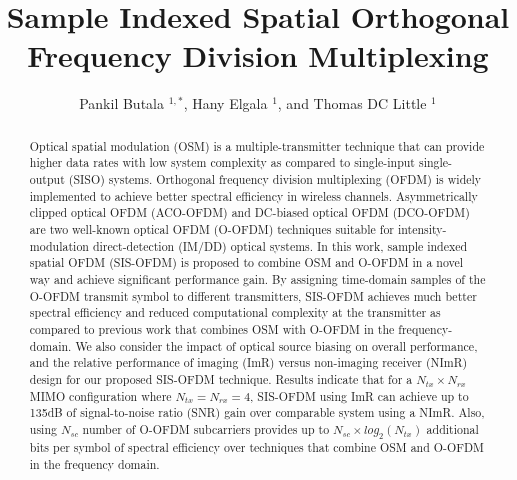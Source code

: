 \documentclass[12pt,letterpaper,onecolumn]{article} %
\begin{document}
\title{Sample Indexed Spatial Orthogonal Frequency Division Multiplexing}

\renewcommand{\baselinestretch}{0.9}
\begin{center}
\begin{CJK*}{GBK}{kai}
\author{Pankil Butala $^{1,*}$, Hany Elgala $^1$,  and Thomas DC Little $^1$\\}
\end{CJK*}
\end{center}
\address{
\emph{$^1$\emph{Department of Electrical and Computer Engineering,\\ Boston University, Boston, MA 02215, USA\\}}
$^*$\emph{Corresponding author: pbutala@bu.edu}
}
\begin{abstract} 
Optical spatial modulation (OSM) is a multiple-transmitter technique that can provide higher data rates with low system complexity as compared to single-input single-output (SISO) systems. Orthogonal frequency division multiplexing (OFDM) is widely implemented to achieve better spectral efficiency in wireless channels. Asymmetrically clipped optical OFDM (ACO-OFDM) and DC-biased optical OFDM (DCO-OFDM) are two well-known optical OFDM (O-OFDM) techniques suitable for intensity-modulation direct-detection (IM/DD) optical systems. In this work, sample indexed spatial OFDM (SIS-OFDM) is proposed to combine OSM and O-OFDM in a novel way and achieve significant performance gain. By assigning time-domain samples of the O-OFDM transmit symbol to different transmitters, SIS-OFDM achieves much better spectral efficiency and reduced computational complexity at the transmitter as compared to previous work that combines OSM with O-OFDM in the frequency-domain. We also consider the impact of optical source biasing on overall performance, and the relative performance of imaging (ImR) versus non-imaging receiver (NImR) design for our proposed SIS-OFDM technique. Results indicate that for a $N_{tx}\times N_{rx}$ MIMO configuration where $N_{tx}=N_{rx}=4$, SIS-OFDM using ImR can achieve up to 135dB of signal-to-noise ratio (SNR) gain over comparable system using a NImR. Also, using $N_{sc}$ number of O-OFDM subcarriers provides up to $N_{sc}\times log_2(N_{tx})$ additional bits per symbol of spectral efficiency over techniques that combine OSM and O-OFDM in the frequency domain.
\end{abstract} 

\end{document}
